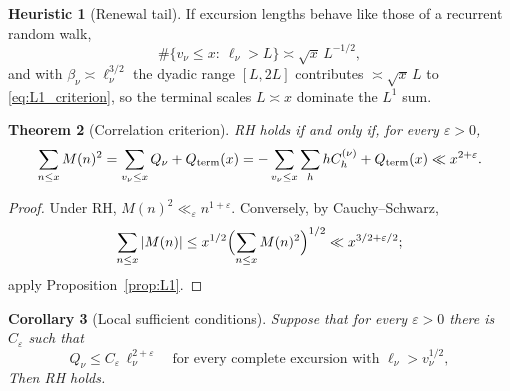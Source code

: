 \documentclass[11pt]{amsart}
\numberwithin{equation}{section}
\theoremstyle{plain}
\newtheorem{theorem}{Theorem}[section]
\newtheorem{corollary}[theorem]{Corollary}
\theoremstyle{definition}
\newtheorem{heuristic}[theorem]{Heuristic}
\theoremstyle{remark}
\newcommand{\eps}{\varepsilon}
\begin{document}
\begin{heuristic}[Renewal tail]
\label{heu:renewal}
If excursion lengths behave like those of a recurrent random walk,
\begin{equation}
\label{eq:renewal_tail}
  \#\{v_\nu\le x:\ \ell_\nu>L\}\asymp\sqrt{x}\,L^{-1/2},
\end{equation}
and with $\beta_\nu\asymp\ell_\nu^{3/2}$ the dyadic range $[L,2L]$
contributes $\asymp\sqrt{x}\,L$ to \eqref{eq:L1_criterion}, so the terminal
scales $L\asymp x$ dominate the $L^1$ sum.
\end{heuristic}

\begin{theorem}[Correlation criterion]
\label{thm:corr-criterion}
RH holds if and only if, for every $\eps>0$,
\begin{equation}
\label{eq:RH-corr}
  \sum_{n\le x}M(n)^2=\sum_{v_\nu\le x}Q_\nu+Q_{\rm term}(x)
  =-\sum_{v_\nu\le x}\sum_{h}hC^{(\nu)}_h+Q_{\rm term}(x)\ll x^{2+\eps}.
\end{equation}
\end{theorem}

\begin{proof}
Under RH, $M(n)^2\ll_\eps n^{1+\eps}$. Conversely, by Cauchy--Schwarz,
\[
\sum_{n\le x}|M(n)|\le x^{1/2}\Bigl(\sum_{n\le x}M(n)^2\Bigr)^{1/2}\ll x^{3/2+\eps/2};
\]
apply
Proposition~\ref{prop:L1}.
\end{proof}

\begin{corollary}[Local sufficient conditions]
\label{cor:local-corr-sufficient}
Suppose that for every $\eps>0$ there is $C_\eps$ such that
\begin{equation}
\label{eq:pruned_Q}
  Q_\nu\le C_\eps\,\ell_\nu^{2+\eps}\quad\text{for every complete excursion with }
  \ell_\nu>v_\nu^{1/2},
\end{equation}
Then RH holds.
\end{corollary}
\end{document}
